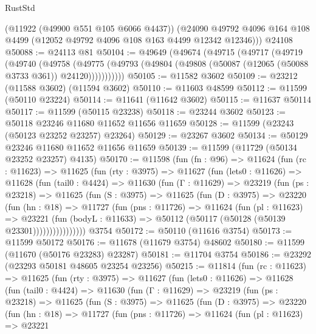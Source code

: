 \begin{lexlean}{RustStd}
\begin{coremodule}
      (@11922 (@49900 @551 @105 @6066 @4437))
      (@24090 @49792 @4096 @164 @108 @4499 (@12052 @49792 @4096 @108 @163 @4499 @12342 @12346)))
    @24108
@50088 := @24113 @81
@50104 := @49649
    (@49674
      (@49715
        (@49717
          (@49719
            (@49740
              (@49758
                (@49775
                  (@49793 (@49804 (@49808 (@50087 (@12065 (@50088 @3733 @361)) @24120)))))))))))
@50105 := @11582 @3602
@50109 := @23212 (@11588 @3602) (@11594 @3602)
@50110 := @11603 @48599
@50112 := @11599 (@50110 @23224)
@50114 := @11641 (@11642 @3602)
@50115 := @11637 @50114
@50117 := @11599 (@50115 @23238)
@50118 := @23244 @3602
@50123 := @50118 @23246 @11680 @11652 @11656 @11659
@50128 := @11599 (@23243 (@50123 @23252 @23257) @23264)
@50129 := @23267 @3602
@50134 := @50129 @23246 @11680 @11652 @11656 @11659
@50139 := @11599 (@11729 (@50134 @23252 @23257) @4135)
@50170 := @11598
    (fun (fn : @96) =>
    @11624
      (fun (rc : @11623) =>
      @11625
        (fun (rty : @3975) =>
        @11627
          (fun (lets0 : @11626) =>
          @11628
            (fun (tail0 : @4424) =>
            @11630
              (fun (Γ : @11629) =>
              @23219
                (fun (ps : @23218) =>
                @11625
                  (fun (S : @3975) =>
                  @11625
                    (fun (D : @3975) =>
                    @23220
                      (fun (hn : @18) =>
                      @11727
                        (fun (pns : @11726) =>
                        @11624
                          (fun (pl : @11623) =>
                          @23221
                            (fun (bodyL : @11633) =>
                            @50112 (@50117 (@50128 (@50139 @23301))))))))))))))))
    @3754
@50172 := @50110 (@11616 @3754)
@50173 := @11599 @50172
@50176 := @11678 (@11679 @3754) @48602
@50180 := @11599 (@11670 (@50176 @23283) @23287)
@50181 := @11704 @3754
@50186 := @23292 (@23293 @50181 @48605 @23254 @23256)
@50215 := @11814
    (fun (rc : @11623) =>
    @11625
      (fun (rty : @3975) =>
      @11627
        (fun (lets0 : @11626) =>
        @11628
          (fun (tail0 : @4424) =>
          @11630
            (fun (Γ : @11629) =>
            @23219
              (fun (ps : @23218) =>
              @11625
                (fun (S : @3975) =>
                @11625
                  (fun (D : @3975) =>
                  @23220
                    (fun (hn : @18) =>
                    @11727
                      (fun (pns : @11726) =>
                      @11624
                        (fun (pl : @11623) =>
                        @23221

\end{coremodule}
\end{lexlean}
